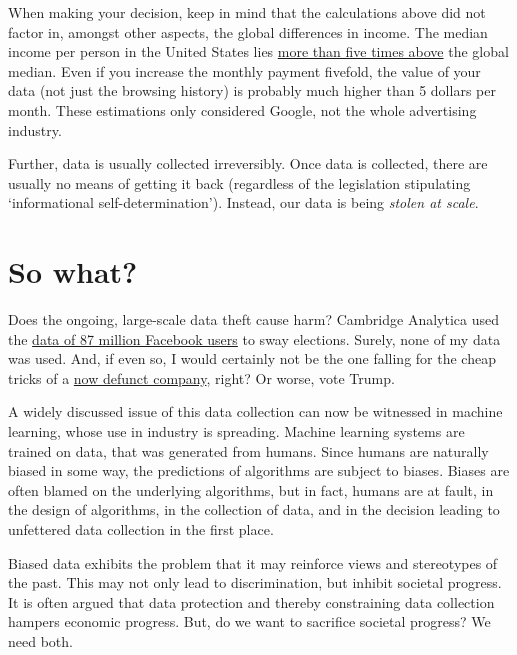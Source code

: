 \documentclass[
]{book}
\begin{document}
When making your decision, keep in mind that the calculations above did not factor in, amongst other aspects, the global differences in income. The median income per person in the United States lies \href{https://news.gallup.com/poll/166211/worldwide-median-household-income-000.aspx}{more than five times above} the global median. Even if you increase the monthly payment fivefold, the value of your data (not just the browsing history) is probably much higher than 5 dollars per month. These estimations only considered Google, not the whole advertising industry.

Further, data is usually collected irreversibly. Once data is collected, there are usually no means of getting it back (regardless of the legislation stipulating `informational self-determination'). Instead, our data is being \emph{stolen at scale}.

\hypertarget{so-what}{%
\section{So what?}\label{so-what}}

Does the ongoing, large-scale data theft cause harm? Cambridge Analytica used the \href{https://about.fb.com/news/2018/04/restricting-data-access/}{data of 87 million Facebook users} to sway elections. Surely, none of my data was used. And, if even so, I would certainly not be the one falling for the cheap tricks of a \href{https://www.theguardian.com/uk-news/2018/may/02/cambridge-analytica-closing-down-after-facebook-row-reports-say}{now defunct company}, right? Or worse, vote Trump.

A widely discussed issue of this data collection can now be witnessed in machine learning, whose use in industry is spreading. Machine learning systems are trained on data, that was generated from humans. Since humans are naturally biased in some way, the predictions of algorithms are subject to biases. Biases are often blamed on the underlying algorithms, but in fact, humans are at fault, in the design of algorithms, in the collection of data, and in the decision leading to unfettered data collection in the first place.

Biased data exhibits the problem that it may reinforce views and stereotypes of the past. This may not only lead to discrimination, but inhibit societal progress. It is often argued that data protection and thereby constraining data collection hampers economic progress. But, do we want to sacrifice societal progress? We need both.
\end{document}
